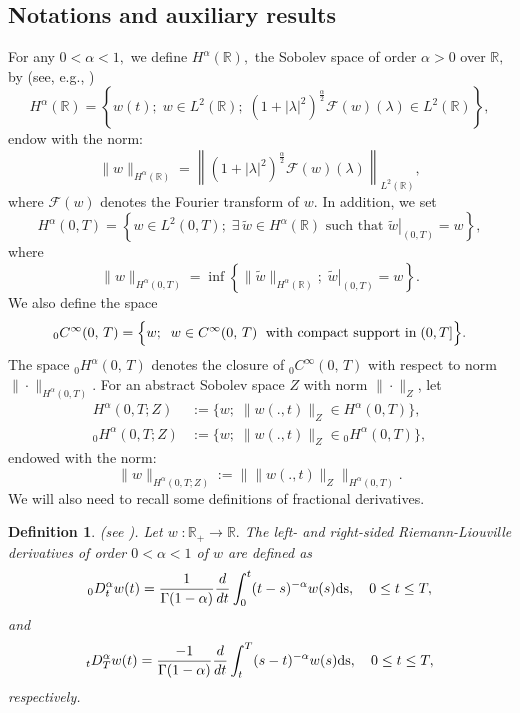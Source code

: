 \documentclass[a4paper,12pt,reqno,natbib]{amsart}
\newtheorem{definition}[theorem]{Definition}
\def\ds{\displaystyle}
\begin{document}
\subsection{Notations and auxiliary results} For any $0<\alpha< 1,$ we define $H^{\alpha}(\mathbb{R}),$ the Sobolev space of order $\alpha>0$ over $\mathbb{R},$ by (see, e.g., \cite{lions2012non})
\begin{equation*}
    H^{\alpha}(\mathbb{R})=\left\{ w(t) ; \; w \in L^{2}(\mathbb{R}) ;\; \left(1+|\lambda|^{2}\right)^{\frac{\alpha}{2}} \mathcal{F}(w)(\lambda) \in L^{2}(\mathbb{R})\right\},
\end{equation*}
endow with the norm:
\begin{equation*}
 \|w\|_{H^{\alpha}(\mathbb{R})}=\left\|\left(1+|\lambda|^{2}\right)^{\frac{\alpha}{2}} \mathcal{F}(w)(\lambda)\right\|_{L^{2}(\mathbb{R})},
\end{equation*}
where $\mathcal{F}(w)$ denotes the Fourier transform of $w$. In addition, we set
\begin{equation*}
    H^{\alpha}(0,T)=\left\{w \in L^{2}(0,T); \;  \exists\, \tilde{w} \in H^{\alpha}(\mathbb{R}) \text { such that }\left.\tilde{w}\right|_{(0,T)}=w\right\},
\end{equation*}
where
\begin{equation*}
    \|w\|_{H^{\alpha}(0,T)}=\inf \left\{ \|\tilde{w}\|_{H^{\alpha}(\mathbb{R})}
; \; \left.\tilde{w}\right|_{(0,T)}=w\right\}.
\end{equation*}
We also define the space
$${ }_0 C^{\infty}(0,\,T)=\Big\{w;\;\; w \in C^{\infty}(0,\,T)\;\hbox{ with compact support in}\; (0,T]\Big\}.$$
The space ${ }_0 H^\alpha(0,\,T)$ denotes the closure of ${ }_0 C^{\infty}(0,\,T)$ with respect to norm $\|\cdot\|_{H^{\alpha}(0,T)}.$ For  an abstract Sobolev space $Z$ with norm $\|\cdot\|_Z$, let
\begin{align*} \displaystyle
H^{\alpha}(0,T; Z)&:=\Big\{w ; \;\|w(., t)\|_{Z} \in H^{\alpha}(0,T)\Big\},  \\
{ }_{0} H^{\alpha}(0,T ; Z)&:=\Big\{w ; \;\|w(., t)\|_{Z} \in{ }_{0} H^{\alpha}(0,T)\Big\},
\end{align*}
endowed with the norm:
\begin{equation*}
     \|w\|_{H^\alpha(0,T; Z)} := \|\|w(.,t) \|_{Z}\|_{H^\alpha(0,T)}.
\end{equation*}
We will also need to recall some definitions of fractional derivatives.
\begin{definition}(see \cite{JinZhou2023}).
 Let $w\; :\mathbb{R}_+\longrightarrow\mathbb{R}.$ The left- and right-sided Riemann-Liouville derivatives of order $0<\alpha<1$ of $w$ are defined as
\begin{equation*}%
    {}_0D^\alpha _{t} w(t) =\frac{1}{\Gamma(1-\alpha)} \ds \frac{d}{dt}\int_0^t (t-s)^{-\alpha} w(s) \hbox{ds},\quad 0\leq t\leq T, 
\end{equation*}
and 
\begin{equation*}%
   {}_tD^{\alpha}_T w(t) =\frac{-1}{\Gamma(1-\alpha)} \ds \frac{d}{dt}\int_t^T (s-t)^{-\alpha} w(s) \hbox{ds},\quad 0\leq t\leq T,
\end{equation*}
respectively.
\end{definition}
\end{document}
